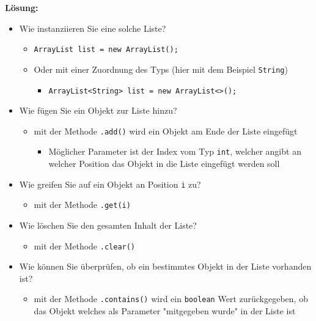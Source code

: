 \documentclass[a4paper,10pt, dvipsnames]{report}
\begin{document}
\textbf{Lösung:}

\begin{itemize}
    \item Wie instanziieren Sie eine solche Liste?
    \begin{itemize}
        \item \texttt{ArrayList list = new ArrayList();}
        \item Oder mit einer Zuordnung des Typs (hier mit dem Beispiel \texttt{String})
        \begin{itemize}
            \item \texttt{ArrayList<String> list = new ArrayList<>();}
        \end{itemize}
    \end{itemize}
    \item Wie fügen Sie ein Objekt zur Liste hinzu?
    \begin{itemize}
        \item mit der Methode \texttt{.add()} wird ein Objekt am Ende der Liste eingefügt
        \begin{itemize}
            \item Möglicher Parameter ist der Index vom Typ \texttt{int}, welcher angibt an welcher Position das Objekt in die Liste eingefügt werden soll
        \end{itemize}
    \end{itemize}
    \item Wie greifen Sie auf ein Objekt an Position \texttt{i} zu?
    \begin{itemize}
        \item mit der Methode \texttt{.get(i)}
    \end{itemize}
    \item Wie löschen Sie den gesamten Inhalt der Liste?
    \begin{itemize}
        \item mit der Methode \texttt{.clear()}
    \end{itemize}
    \item Wie können Sie überprüfen, ob ein bestimmtes Objekt in der Liste vorhanden ist?
    \begin{itemize}
        \item mit der Methode \texttt{.contains()} wird ein \texttt{boolean} Wert zurückgegeben, ob das Objekt welches als Parameter "mitgegeben wurde" in der Liste ist
    \end{itemize}
\end{itemize}
\end{document}
